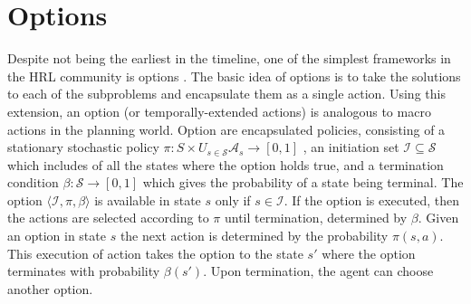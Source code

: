 \section{Options}

Despite not being the earliest in the timeline, one of the simplest frameworks in the HRL community is options  \cite{Sutton}. The basic idea of options is to take the solutions to each of the subproblems and encapsulate them as a single action. Using this extension, an option (or temporally-extended actions) is analogous to macro actions in the planning world. Option are encapsulated policies, consisting of a stationary stochastic policy \(\pi:S \times U_{s \in \mathcal{S}}  \mathcal{A}_s \rightarrow [0,1]\) , an initiation set \(\mathcal{I} \subseteq  \mathcal{S}\) which includes of all the states where the option holds true, and a termination condition \(\beta:\mathcal{S} \rightarrow [0,1]\) which gives the probability of a state being terminal. The option \( \langle \mathcal{I},\pi,\beta \rangle \) is available in state \(s\) only if \(s \in \mathcal{I} \). If the option is executed, then the actions are selected according to \(\pi\) until termination, determined by \(\beta\). Given an option in state \(s\) the next action is determined by the probability \(\pi(s,a)\). This execution of action takes the option to the state \(s'\) where the option terminates with probability \(\beta(s')\). Upon termination, the agent can choose another option.

\iffalse
Consider a humanoid robot which has the task of opening the door to exit a room. This problem can further have subproblems like reaching, grasping and turning the knob. The initiation set considers of all the states where the agent is inside the room. Actions include navigating within the room, grasping the door knob and turning it to leave the room. The policies determine the ways to navigate through this small world. On exiting the room, \(\beta(s)=1\), which is the only terminal state for this example. This option can further be a part of any larger problem. In other words, options can act as actions within another option. These chain of options gives the hierarchy. Thus, in HRL a set of options replaces the set of actions. \\
\fi

